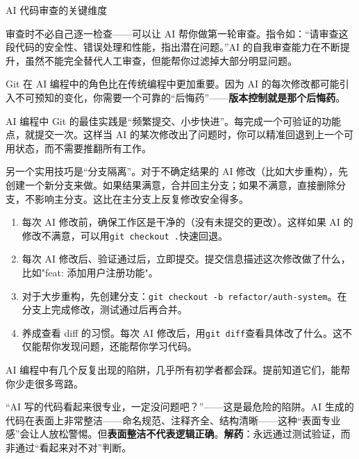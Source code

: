 \begin{center}\small\color{gray}AI 代码审查的关键维度\end{center}

审查时不必自己逐一检查——可以让 AI 帮你做第一轮审查。指令如：“请审查这段代码的安全性、错误处理和性能，指出潜在问题。”AI 的自我审查能力在不断提升，虽然不能完全替代人工审查，但能帮你过滤掉大部分明显问题。


Git 在 AI 编程中的角色比在传统编程中更加重要。因为 AI 的每次修改都可能引入不可预知的变化，你需要一个可靠的“后悔药”——\textbf{版本控制就是那个后悔药}。

AI 编程中 Git 的最佳实践是“频繁提交、小步快进”。每完成一个可验证的功能点，就提交一次。这样当 AI 的某次修改出了问题时，你可以精准回退到上一个可用状态，而不需要推翻所有工作。

另一个实用技巧是“分支隔离”。对于不确定结果的 AI 修改（比如大步重构），先创建一个新分支来做。如果结果满意，合并回主分支；如果不满意，直接删除分支，不影响主分支。这比在主分支上反复修改安全得多。

\begin{enumerate}
  \item 每次 AI 修改前，确保工作区是干净的（没有未提交的更改）。这样如果 AI 的修改不满意，可以用\texttt{git checkout .}快速回退。
  \item 每次 AI 修改后、验证通过后，立即提交。提交信息描述这次修改做了什么，比如"feat: 添加用户注册功能"。
  \item 对于大步重构，先创建分支：\texttt{git checkout -b refactor/auth-system}。在分支上完成修改，测试通过后再合并。
  \item 养成查看 diff 的习惯。每次 AI 修改后，用\texttt{git diff}查看具体改了什么。这不仅能帮你发现问题，还能帮你学习代码。
\end{enumerate}


AI 编程中有几个反复出现的陷阱，几乎所有初学者都会踩。提前知道它们，能帮你少走很多弯路。


“AI 写的代码看起来很专业，一定没问题吧？”——这是最危险的陷阱。AI 生成的代码在表面上非常整洁——命名规范、注释齐全、结构清晰——这种“表面专业感”会让人放松警惕。但\textbf{表面整洁不代表逻辑正确}。\textbf{解药}：永远通过测试验证，而非通过“看起来对不对”判断。


